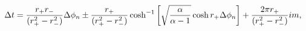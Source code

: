 \begin{equation} \label{lsing}
\Delta t = {r_+ r_- \over (r_+^2 - r_-^2)}\Delta \phi_n \pm {r_+ \over
(r_+^2 - r_-^2)} \cosh^{-1} \left[ \sqrt{ \alpha \over \alpha-1} \cosh
r_+ \Delta \phi_n \right] + {2\pi r_+ \over (r_+^2 - r_-^2)} i m,
\end{equation}

